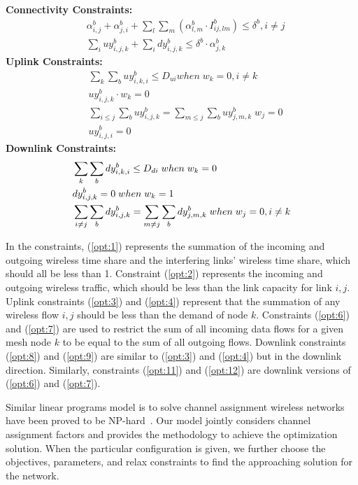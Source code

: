 \noindent
{\bf Connectivity Constraints:}
\begin{align}
\label{opt:1}
& \alpha_{i,j}^b + \alpha_{j,i}^b + \sum_l\sum_m(\alpha_{l,m}^b \cdot I_{ij,lm}^b) \leq \delta^b, i\neq j \\
\label{opt:2}
& \sum_i uy_{i,j,k}^b + \sum_i dy_{i,j,k}^b \leq \delta^b \cdot \alpha_{j,k}^b 
\end{align}
\noindent
{\bf Uplink Constraints:} 
\begin{align}
\label{opt:3}
& \sum_k \sum_b uy_{i,k,i}^b \leq D_{ui}  when \; w_k=0, i \neq k \\
\label{opt:4}
& uy_{i,j,k}^b \cdot w_k = 0 \\
\label{opt:6}
& \sum_{i\leq j}\sum_b uy_{i,j,k}^b = \sum_{m\leq j} \sum_b uy_{j,m,k}^b \; w_j = 0\\
\label{opt:7}
& uy_{i,j,i}^b=0 
\end{align}
\noindent
{\bf Downlink Constraints:} 
\begin{align}
{\bf}
\label{opt:8}
& \sum_k \sum_b dy_{i,k,i}^b \leq D_{di} \; when \; w_k=0 \\
\label{opt:9}
& dy_{i,j,k}^b =0 \; when \; w_k=1 \\
\label{opt:11}
& \sum_{i\neq j} \sum_b dy_{i,j,k}^b = \sum_{m \neq j} \sum_b dy_{j,m,k}^b  \; when \; w_j=0, i \neq k 
\end{align}

In the constraints, (\ref{opt:1}) represents the summation of the incoming and outgoing 
wireless time share and the interfering links' wireless time share, which should all be less than 1.
Constraint (\ref{opt:2}) represents the incoming and outgoing wireless traffic, which 
should be less than the link capacity for link $i,j$. Uplink constraints (\ref{opt:3})
and (\ref{opt:4}) represent that the summation of any wireless flow $i,j$ should be less than
the demand of node $k$.  Constraints (\ref{opt:6}) and (\ref{opt:7}) are used to restrict
the sum of all incoming data flows for a given mesh node $k$ to be equal to the 
sum of all outgoing flows. Downlink constraints (\ref{opt:8}) and (\ref{opt:9}) are
similar to (\ref{opt:3}) and (\ref{opt:4}) but in the downlink direction.  Similarly,
constraints (\ref{opt:11}) and (\ref{opt:12}) are downlink versions of 
(\ref{opt:6}) and (\ref{opt:7}).

Similar linear programs model is to solve channel assignment 
wireless networks have been proved to be NP-hard~\cite{yuan2006cross}. 
Our model jointly considers channel assignment factors and provides the 
methodology to achieve the optimization solution. 
When the particular configuration is given, we further 
choose the objectives, parameters, and relax constraints to 
find the approaching solution for the network.  
 
